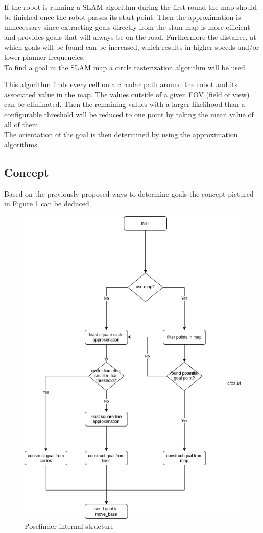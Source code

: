 If the robot is running a SLAM algorithm during the first round the map should be finished once the robot passes its start point. Then the approximation is unnecessary since extracting goals directly from the slam map is more efficient and provides goals that will  always be on the road. Furthermore the distance, at which goals will be found can be increased, which results in higher speeds and/or lower planner frequencies.\\

To find a goal in the SLAM map a circle rasterization algorithm will be used.\\

This algorithm finds every cell on a circular path around the robot and its associated value in the map. The values outside of a given FOV (field of view) can be eliminated. Then the remaining values with a larger likelihood than a configurable threshold will be reduced to one point by taking the mean value of all of them.\\

The orientation of the goal is then determined by using the approximation algorithms.

\subsection{Concept}

Based on the previously proposed ways to determine goals the concept pictured in Figure \ref{posefinder structure} can be deduced.\\

\begin{figure}[H]
	\centering
	\includegraphics[width=.5\textwidth]{Pictures/posefinder diagram}
	\caption{Posefinder internal structure}
	\label{posefinder structure}
\end{figure}

